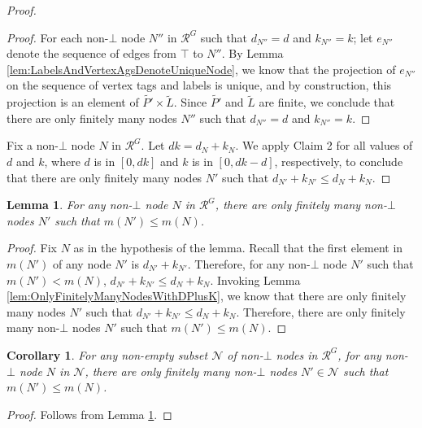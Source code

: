 \documentclass[11pt]{article}
\numberwithin{theorem}{section}
\newtheorem{lemma}[theorem]{Lemma}
\newtheorem{corollary}[theorem]{Corollary}
\begin{document}
\begin{proof}
\begin{proof}
For each non-$\bot$ node $N''$ in $\mathcal{R}^G$ such that $d_{N''} = d$ and $k_{N''} = k$; let $e_{N''}$ denote the sequence of edges from $\top$ to $N''$. By Lemma \ref{lem:LabelsAndVertexAgsDenoteUniqueNode}, we know that the projection of $e_{N''}$ on the sequence of vertex tags and labels is unique, and by construction, this projection is an element of $\tilde{P'} \times \tilde{L}$. Since $\tilde{P'}$ and $\tilde{L}$ are finite, we conclude that there are only finitely many nodes $N''$ such that $d_{N''} = d$ and $k_{N''} = k$.
\end{proof}

Fix a non-$\bot$ node $N$ in $\mathcal{R}^G$. Let $dk = d_{N} + k_{N}$. We apply Claim 2 for all values of $d$ and $k$, where $d$ is in $[0,dk]$ and $k$ is in $[0, dk-d]$, respectively, to conclude that there are only finitely many nodes $N'$ such that $d_{N'} + k_{N'} \leq d_{N} + k_{N}$.
\end{proof}

\begin{lemma}\label{lem:finitelyManyNodesWithSmallerMetric}
For any non-$\bot$ node $N$ in $\mathcal{R}^G$, there are only finitely many non-$\bot$ nodes $N'$ such that $m(N') \leq m(N)$.
\end{lemma}
\begin{proof}
Fix $N$ as in the hypothesis of the lemma. 
Recall that the first element in $m(N')$ of any node $N'$ is $d_{N'} + k_{N'}$. Therefore, for any non-$\bot$ node $N'$ such that $m(N') < m(N)$, $d_{N'} + k_{N'} \leq d_{N} + k_{N}$.
Invoking Lemma \ref{lem:OnlyFinitelyManyNodesWithDPlusK}, we know that there are only finitely many nodes $N'$ such that $d_{N'} + k_{N'} \leq d_{N} + k_{N}$. Therefore, there are only finitely many non-$\bot$ nodes $N'$ such that $m(N') \leq m(N)$.
\end{proof}

\begin{corollary}\label{cor:finitelyManyNodesWithSmallerMetricInSubset}
For any non-empty subset $\mathcal{N}$ of non-$\bot$ nodes in $\mathcal{R}^G$, for any non-$\bot$ node $N$ in $\mathcal{N}$, there are only finitely many non-$\bot$ nodes $N' \in \mathcal{N}$ such that $m(N') \leq m(N)$.
\end{corollary}
\begin{proof}
Follows from Lemma \ref{lem:finitelyManyNodesWithSmallerMetric}.
\end{proof}
\end{document}

